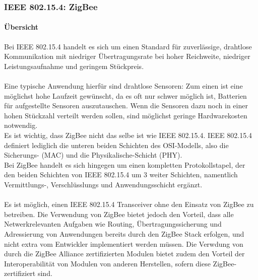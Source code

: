         \subsubsection{IEEE 802.15.4: ZigBee}
            \paragraph{Übersicht}
                Bei IEEE 802.15.4 handelt es sich um einen Standard für 
                zuverlässige, drahtlose Kommunikation mit niedriger Übertragungsrate
                bei hoher Reichweite, niedriger Leistungsaufnahme und geringem Stückpreis.\\
                \\
                Eine typische Anwendung hierfür sind drahtlose Sensoren: Zum einen
                ist eine möglichst hohe Laufzeit gewünscht, da es oft nur schwer
                möglich ist, Batterien für aufgestellte Sensoren auszutauschen.
                Wenn die Sensoren dazu noch in einer hohen Stückzahl verteilt werden
                sollen, sind möglichst geringe Hardwarekosten notwendig.
                \\
                Es ist wichtig, dass ZigBee nicht das selbe ist wie IEEE 802.15.4.
                IEEE 802.15.4 definiert lediglich die unteren beiden Schichten des
                OSI-Modells, also die Sicherungs- (MAC) und die Physikalische-Schicht 
                (PHY).\\
                Bei ZigBee handelt es sich hingegen um einen kompletten Protokollstapel,
                der den beiden Schichten von IEEE 802.15.4 um 3 weiter Schichten,
                namentlich Vermittlungs-, Verschlüsslungs und Anwendungsschicht 
                ergänzt.  \\
                \\
                Es ist möglich, einen IEEE 802.15.4 Transceiver ohne den Einsatz
                von ZigBee zu betreiben. Die Verwendung von ZigBee bietet jedoch
                den Vorteil, dass alle Netwerkrelevanten Aufgaben wie Routing,
                Übertragungssicherung und Adressierung von Anwendungen bereits
                durch den ZigBee Stack erfolgen, und nicht extra vom Entwickler
                implementiert werden müssen. Die Verwdung von durch die
                ZigBee Alliance zertifizierten Modulen bietet zudem den
                Vorteil der Interoperabilität von Modulen von anderen Herstellen,
                sofern diese ZigBee-zertifiziert sind.

